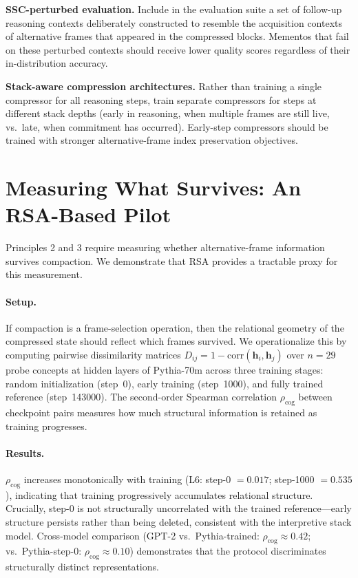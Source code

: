 \documentclass[12pt]{article}
\begin{document}
\textbf{SSC-perturbed evaluation.}
Include in the evaluation suite a set of follow-up reasoning contexts
deliberately constructed to resemble the acquisition contexts of
alternative frames that appeared in the compressed blocks. Mementos
that fail on these perturbed contexts should receive lower quality scores
regardless of their in-distribution accuracy.

\textbf{Stack-aware compression architectures.}
Rather than training a single compressor for all reasoning steps,
train separate compressors for steps at different stack depths
(early in reasoning, when multiple frames are still live, vs.\ late,
when commitment has occurred). Early-step compressors should be trained
with stronger alternative-frame index preservation objectives.

\section{Measuring What Survives: An RSA-Based Pilot}
\label{sec:pilot}

Principles 2 and 3 require measuring whether alternative-frame
information survives compaction.
We demonstrate that RSA provides a tractable proxy for this
measurement.

\paragraph{Setup.}
If compaction is a frame-selection operation, then the relational
geometry of the compressed state should reflect which frames survived.
We operationalize this by computing pairwise dissimilarity matrices
$D_{ij} = 1 - \mathrm{corr}(\mathbf{h}_i, \mathbf{h}_j)$ over
$n = 29$ probe concepts at hidden layers of Pythia-70m
\citep{biderman2023} across three training stages: random
initialization (step~0), early training (step~1000), and fully
trained reference (step~143000).
The second-order Spearman correlation $\rho_\mathrm{cog}$ between
checkpoint pairs measures how much structural information is retained
as training progresses.

\paragraph{Results.}
$\rho_\mathrm{cog}$ increases monotonically with training
(L6: step-0 $= 0.017$; step-1000 $= 0.535$), indicating that
training progressively accumulates relational structure.
Crucially, step-0 is not structurally uncorrelated with the
trained reference---early structure persists rather than being
deleted, consistent with the interpretive stack model.
Cross-model comparison (GPT-2 vs.\ Pythia-trained:
$\rho_\mathrm{cog} \approx 0.42$; vs.\ Pythia-step-0:
$\rho_\mathrm{cog} \approx 0.10$) demonstrates that the
protocol discriminates structurally distinct representations.
\end{document}
